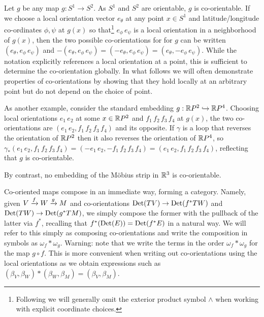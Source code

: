 \begin{example}
Let $g$ be any map $g: S^1\to S^2$. As $S^1$ and $S^2$ are orientable, $g$ is co-orientable.  If we choose a local orientation vector $e_{\theta}$ at any point $x\in S^1$ and latitude/longitude co-ordinates $\phi,\psi$ at $g(x)$ so that\footnote{Following \cite{BoTu82} we will generally omit the exterior product symbol $\wedge$ when working with explicit coordinate choices.} $e_\phi\, e_\psi$ is a local orientation in a neighborhood of $g(x)$, then the two possible co-orientations for for $g$ can be written $(e_\theta, e_\phi\, e_\psi)$ and $-(e_\theta, e_\phi\, e_\psi)=(-e_\theta, e_\phi \,e_\psi)=(e_\theta,- e_\phi\, e_\psi)$. While the notation explicitly references a local orientation at a point, this is sufficient to determine the co-orientation globally. In what follows we will often demonstrate properties of co-orientations by showing that they hold locally at an arbitrary point but do not depend on the choice of point.

As another example, consider the standard embedding $g:\mathbb{R} P^2\hookrightarrow \mathbb{R} P^4$. Choosing local orientations $e_1\,e_2$ at some $x\in \mathbb{R} P^2$ and $f_1\,f_2\,f_3\,f_4$ at $g(x)$, the two co-orientations are 
$(e_1\,e_2, f_1\,f_2\,f_3\,f_4)$ and its opposite. If $\gamma$ is a loop  that reverses the orientation of $\mathbb{R} P^2$ then it also reverses the orientation of $\mathbb{R} P^4$, so $\gamma_*(e_1\,e_2, f_1\,f_2\,f_3\,f_4)=(-e_1\,e_2,- f_1\,f_2\,f_3\,f_4)=(e_1\,e_2, f_1\,f_2\,f_3\,f_4)$, reflecting that $g$ is co-orientable. 

By contrast, no embedding of the M\"obius strip in $\mathbb{R}^3$ is co-orientable. 
\end{example}


\begin{remark}\label{R: cooriented composition}
Co-oriented maps compose in an immediate way, forming a category. 
Namely, given $V\xrightarrow{f} W\xrightarrow{g}M$ and co-orientations ${\rm Det}(TV)\to {\rm Det}(f^*TW)$ and ${\rm Det}(TW)\to {\rm Det}(g^*TM)$,  we simply compose the former  with the pullback of the latter via $f^*$, recalling that $f^*({\rm Det}(E))={\rm Det}(f^*E)$ in a natural way. We will refer to this simply as composing co-orientations and write the composition in symbols as $\omega_f*\omega_g$. Warning: note that we write the terms in the order $\omega_f*\omega_g$ for the map $g\circ f$. This is more convenient when writing out co-orientations using the local orientations as we obtain expressions such as $(\beta_V, \beta_W)*(\beta_W,\beta_M)=(\beta_V,\beta_M)$.
\end{remark}

